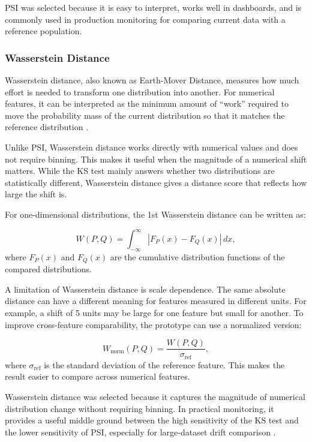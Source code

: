PSI was selected because it is easy to interpret, works well in dashboards, and is commonly used in production monitoring for comparing current data with a reference population.

\subsubsection{Wasserstein Distance}

Wasserstein distance, also known as Earth-Mover Distance, measures how much effort is needed to transform one distribution into another. For numerical features, it can be interpreted as the minimum amount of ``work'' required to move the probability mass of the current distribution so that it matches the reference distribution \cite{EvidentlyDataDriftLargeDatasets,SciPyDocumentation}.

Unlike PSI, Wasserstein distance works directly with numerical values and does not require binning. This makes it useful when the magnitude of a numerical shift matters. While the KS test mainly answers whether two distributions are statistically different, Wasserstein distance gives a distance score that reflects how large the shift is.

For one-dimensional distributions, the 1st Wasserstein distance can be written as:

\begin{equation}
W(P,Q) = \int_{-\infty}^{\infty} \left| F_P(x) - F_Q(x) \right| \, dx,
\end{equation}
where $F_P(x)$ and $F_Q(x)$ are the cumulative distribution functions of the compared distributions.

A limitation of Wasserstein distance is scale dependence. The same absolute distance can have a different meaning for features measured in different units. For example, a shift of 5 units may be large for one feature but small for another. To improve cross-feature comparability, the prototype can use a normalized version:

\begin{equation}
W_{\mathrm{norm}}(P,Q) = \frac{W(P,Q)}{\sigma_{\mathrm{ref}}},
\end{equation}
where $\sigma_{\mathrm{ref}}$ is the standard deviation of the reference feature. This makes the result easier to compare across numerical features.

Wasserstein distance was selected because it captures the magnitude of numerical distribution change without requiring binning. In practical monitoring, it provides a useful middle ground between the high sensitivity of the KS test and the lower sensitivity of PSI, especially for large-dataset drift comparison \cite{EvidentlyDataDriftLargeDatasets}.

